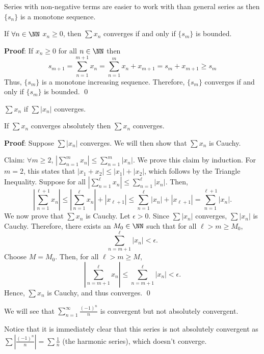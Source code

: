 \noindent Series with non-negative terms are easier to work with than general series as then $\{s_n\}$ is a monotone sequence.

\begin{theorem}
If $\forall n \in \NN$ $x_n \geq 0$, then $\sum x_n$ converges if and only if $\{s_m\}$ is bounded. 
\end{theorem}
\textbf{Proof}: If $x_n \geq 0$ for all $n\in \NN$ then 
\[
s_{m+1} = \sum_{n=1}^{m+1} x_n = \sum_{n=1}^m x_n + x_{m+1} = s_m  + x_{m+1} \geq s_m
\]
Thus, $\{s_m\}$ is a monotone increasing sequence. Therefore, $\{s_m\}$ converges if and only if $\{s_m\}$ is bounded. \qed 

\begin{definition}
$\sum x_n$  if $\sum |x_n|$ converges.
\end{definition}

\begin{theorem}
If $\sum x_n$ converges absolutely then $\sum x_n$ converges.
\end{theorem}
\textbf{Proof}: Suppose $\sum |x_n|$ converges. We will then show that $\sum x_n$ is Cauchy.

Claim: $\forall m\geq 2$, $\left|\sum_{n=1}^m x_n \right| \leq \sum_{n=1}^m |x_n|$. We prove this claim by induction. For $m=2$, this states that $|x_1 + x_2| \leq |x_1|+|x_2|$, which follows by the Triangle Inequality. Suppose for all $\left|\sum_{n=1}^\ell x_n\right| \leq \sum_{n=1}^\ell |x_n|.$ Then, 
\[
\left|\sum_{n=1}^{\ell+1} x_n\right| \leq \left|\sum_{n=1}^{\ell} x_n \right| + |x_{\ell+1}| \leq \sum_{n=1}^\ell |x_n| + |x_{\ell+1}| = \sum_{n=1}^{\ell+1} |x_n|.
\]
We now prove that $\sum x_n$ is Cauchy. Let $\epsilon >0$. Since $\sum |x_n|$ converges, $\sum |x_n|$ is Cauchy. Therefore, there exists an $M_0 \in \NN$ such that for all $\ell > m \geq M_0$, 
\[
\sum_{n=m+1}^\ell |x_n| < \epsilon.
\]
Choose $M = M_0$. Then, for all $\ell >m\geq M$, 
\[
\left|\sum_{n=m+1}^\ell x_n\right| \leq \sum_{n=m+1}^\ell |x_n| < \epsilon.
\]
Hence, $\sum x_n$ is Cauchy, and thus converges. \qed 

\begin{remark}
We will see that $\sum_{n=1}^\infty \frac{(-1)^n}{n}$ is convergent but not absolutely convergent.
\end{remark}

Notice that it is immediately clear that this series is not absolutely convergent as $\sum \left|\frac{(-1)^n}{n}\right| = \sum \frac{1}{n}$ (the harmonic series), which doesn't converge.

